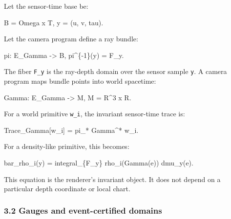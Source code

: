 \documentclass[
]{article}
\newenvironment{Shaded}{}{}
\newcommand{\NormalTok}[1]{#1}
\begin{document}
Let the sensor-time base be:

\begin{Shaded}
\begin{Highlighting}[]
\NormalTok{B = Omega x T,      y = (u, v, tau).}
\end{Highlighting}
\end{Shaded}

Let the camera program define a ray bundle:

\begin{Shaded}
\begin{Highlighting}[]
\NormalTok{pi: E\_Gamma {-}\textgreater{} B,}
\NormalTok{pi\^{}\{{-}1\}(y) = F\_y.}
\end{Highlighting}
\end{Shaded}

The fiber \texttt{F\_y} is the ray-depth domain over the sensor sample
\texttt{y}. A camera program maps bundle points into world spacetime:

\begin{Shaded}
\begin{Highlighting}[]
\NormalTok{Gamma: E\_Gamma {-}\textgreater{} M,      M = R\^{}3 x R.}
\end{Highlighting}
\end{Shaded}

For a world primitive \texttt{w\_i}, the invariant sensor-time trace is:

\begin{Shaded}
\begin{Highlighting}[]
\NormalTok{Trace\_Gamma[w\_i] = pi\_* Gamma\^{}* w\_i.}
\end{Highlighting}
\end{Shaded}

For a density-like primitive, this becomes:

\begin{Shaded}
\begin{Highlighting}[]
\NormalTok{bar\_rho\_i(y) = integral\_\{F\_y\} rho\_i(Gamma(e)) dmu\_y(e).}
\end{Highlighting}
\end{Shaded}

This equation is the renderer's invariant object. It does not depend on
a particular depth coordinate or local chart.

\subsubsection{3.2 Gauges and event-certified
domains}\label{gauges-and-event-certified-domains}
\end{document}
